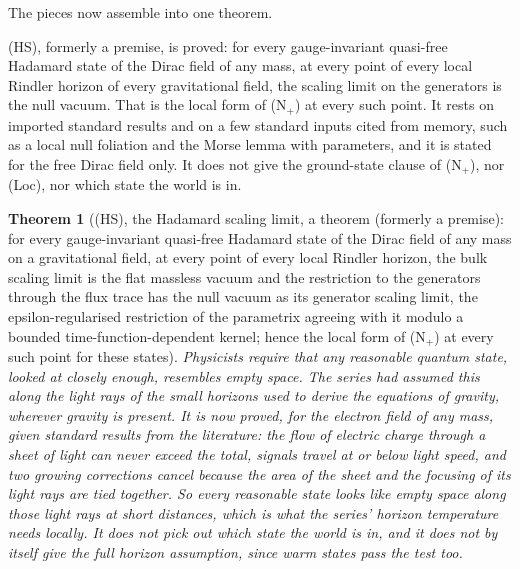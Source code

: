 \documentclass[11pt]{article}
\newtheorem{theorem}{Theorem}[section]
\theoremstyle{definition}
\theoremstyle{plain}
\begin{document}
The pieces now assemble into one theorem.

(HS), formerly a premise, is proved: for every gauge-invariant quasi-free Hadamard state of the Dirac field of any mass, at every point of every local Rindler horizon of every gravitational field, the scaling limit on the generators is the null vacuum. That is the local form of (N$_{+}$) at every such point. It rests on imported standard results and on a few standard inputs cited from memory, such as a local null foliation and the Morse lemma with parameters, and it is stated for the free Dirac field only. It does not give the ground-state clause of (N$_{+}$), nor (Loc), nor which state the world is in.

\begin{theorem}[(HS), the Hadamard scaling limit, a theorem (formerly a premise): for every gauge-invariant quasi-free Hadamard state of the Dirac field of any mass on a gravitational field, at every point of every local Rindler horizon, the bulk scaling limit is the flat massless vacuum and the restriction to the generators through the flux trace has the null vacuum as its generator scaling limit, the epsilon-regularised restriction of the parametrix agreeing with it modulo a bounded time-function-dependent kernel; hence the local form of (N$_{+}$) at every such point for these states]\label{c:synthesis.hadamard-scaling-limit-premise}
Physicists require that any reasonable quantum state, looked at closely enough, resembles empty space. The series had assumed this along the light rays of the small horizons used to derive the equations of gravity, wherever gravity is present. It is now proved, for the electron field of any mass, given standard results from the literature: the flow of electric charge through a sheet of light can never exceed the total, signals travel at or below light speed, and two growing corrections cancel because the area of the sheet and the focusing of its light rays are tied together. So every reasonable state looks like empty space along those light rays at short distances, which is what the series' horizon temperature needs locally. It does not pick out which state the world is in, and it does not by itself give the full horizon assumption, since warm states pass the test too.
\end{theorem}
\end{document}
